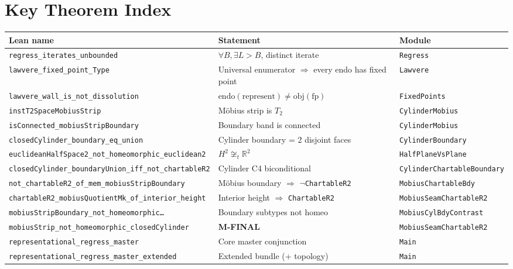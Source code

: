 \documentclass[11pt]{article}
\newcommand{\leanref}[1]{\texttt{\small #1}}
\begin{document}
\section{Key Theorem Index}
\label{app:theorems}


\begin{table}[h]
\centering
\small
\begin{tabular}{@{}lp{6.5cm}l@{}}
\toprule
\textbf{Lean name} & \textbf{Statement} & \textbf{Module} \\
\midrule
\leanref{regress\_iterates\_unbounded} & $\forall B, \exists L > B$, distinct iterate & \leanref{Regress} \\
\leanref{lawvere\_fixed\_point\_Type} & Universal enumerator $\Rightarrow$ every endo has fixed point & \leanref{Lawvere} \\
\leanref{lawvere\_wall\_is\_not\_dissolution} & $\mathrm{endo}(\mathrm{represent}) \neq \mathrm{obj}(\mathrm{fp})$ & \leanref{FixedPoints} \\
\leanref{instT2SpaceMobiusStrip} & M\"obius strip is $T_2$ & \leanref{CylinderMobius} \\
\leanref{isConnected\_mobiusStripBoundary} & Boundary band is connected & \leanref{CylinderMobius} \\
\leanref{closedCylinder\_boundary\_eq\_union} & Cylinder boundary = 2 disjoint faces & \leanref{CylinderBoundary} \\
\leanref{euclideanHalfSpace2\_not\_homeomorphic\_euclidean2} & $H^2 \not\cong_t \mathbb{R}^2$ & \leanref{HalfPlaneVsPlane} \\
\leanref{closedCylinder\_boundaryUnion\_iff\_not\_chartableR2} & Cylinder C4 biconditional & \leanref{CylinderChartableBoundary} \\
\leanref{not\_chartableR2\_of\_mem\_mobiusStripBoundary} & M\"obius boundary $\Rightarrow$ $\neg$\leanref{ChartableR2} & \leanref{MobiusChartableBdy} \\
\leanref{chartableR2\_mobiusQuotientMk\_of\_interior\_height} & Interior height $\Rightarrow$ \leanref{ChartableR2} & \leanref{MobiusSeamChartableR2} \\
\leanref{mobiusStripBoundary\_not\_homeomorphic\ldots} & Boundary subtypes not homeo & \leanref{MobiusCylBdyContrast} \\
\leanref{mobiusStrip\_not\_homeomorphic\_closedCylinder} & \textbf{M-FINAL} & \leanref{MobiusSeamChartableR2} \\
\leanref{representational\_regress\_master} & Core master conjunction & \leanref{Main} \\
\leanref{representational\_regress\_master\_extended} & Extended bundle (+ topology) & \leanref{Main} \\
\bottomrule
\end{tabular}
\end{table}
\end{document}
